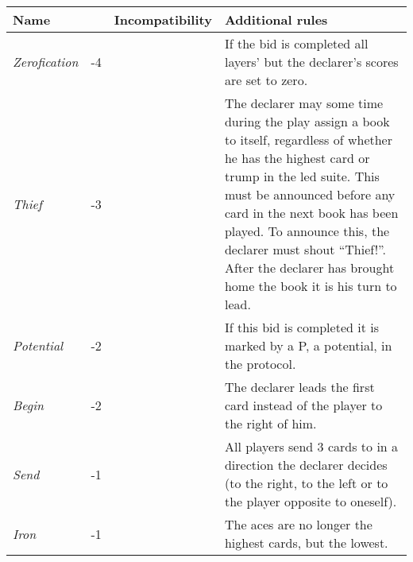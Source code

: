 %
%
%

\begin{table}
	\begin{center}
		\footnotesize {
			\begin{tabularx}{\textwidth}{ lcX | p{6cm} }
					\textbf{Name} & \rotccw{\textbf{Worth}} & {\textbf{Incompatibility}} & \textbf{Additional rules}
					\\ \hline
					
					\textit{Zerofication} & -4 &
					&
					If the bid is completed all layers' but the declarer's scores are set to zero.
					\\ \hline
					
					\textit{Thief} & -3 &
					&
					The declarer may some time during the play assign a book to itself, regardless of whether he has the highest card or trump in the led suite. This must be announced before any card in the next book has been played. To announce this, the declarer must shout ``Thief!''. After the declarer has brought home the book it is his turn to lead.
					\\ \hline
					
					\textit{Potential} & -2 &
					&
					If this bid is completed it is marked by a P, a potential, in the protocol.
					\\ \hline
					
					\textit{Begin} & -2 &
					&
					The declarer leads the first card instead of the player to the right of him.
					\\ \hline
					
					\textit{Send} & -1 &
					&
					All players send 3 cards to in a direction the declarer decides (to the right, to the left or to the player opposite to oneself).
					\\ \hline
					
					\textit{Iron} & -1 &
					&
					The aces are no longer the highest cards, but the lowest.
					\\ \hline
					

\end{tabularx}}
\end{center}
\end{table}
